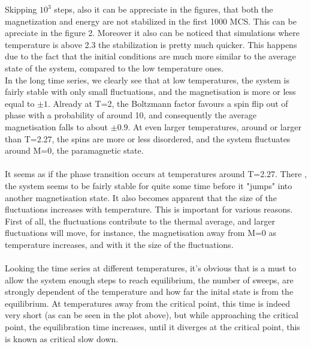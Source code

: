 \documentclass[article]{revtex4}
\begin{document}
Skipping $10^3$ steps, also it can be appreciate in the figures, that both the magnetization and energy are not stabilized in the first 1000 MCS. This can be apreciate in the figure 2. Moreover it also can be noticed that simulations where temperature is above 2.3 the stabilization is pretty much quicker. This happens due to the fact that the initial conditions are much more similar to the average state of the system, compared to the low temperature ones.
\\
In the long time series, we clearly see that at low temperatures, the system is fairly stable with only small fluctuations, and the magnetisation is more or less equal to $ \pm1$. Already at T=2, the Boltzmann factor favours a spin flip out of phase with a probability of around 10, and consequently the average magnetisation falls to about $ \pm 0.9$. At even larger temperatures, around or larger than T=2.27, the spins are more or less disordered, and the system fluctuates around M=0, the paramagnetic state. 
\\
\\
It seems as if the phase transition occurs at temperatures around T=2.27. There , the system seems to be fairly stable for quite some time before it "jumps" into another magnetisation state. It also becomes apparent that the size of the fluctuations increases with temperature. This is important for various reasons. First of all, the fluctuations contribute to the thermal average, and larger fluctuations will move, for instance, the magnetisation away from M=0 as temperature increases, and with it the size of the fluctuations. 
\\
\\
Looking the time series at different temperatures, it's obvious that is a must to allow the system enough steps to reach equilibrium,
the number of sweeps, are strongly dependent of the temperature and how far the inital state is from the equilibrium. At temperatures away from the critical point, this time is indeed very short (as can be seen in the plot above), but while approaching the critical point, the equilibration time increases, until it diverges at the critical point, this is known as critical slow down.
\\
\end{document}
